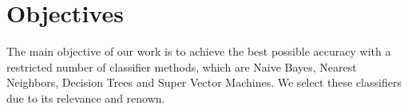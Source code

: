 \section{Objectives}
The main objective of our work is to achieve the best possible accuracy with a restricted number of classifier methods, which are Naive Bayes, Nearest Neighbors, Decision Trees and Super Vector Machines. We select these classifiers due to its relevance and renown. 